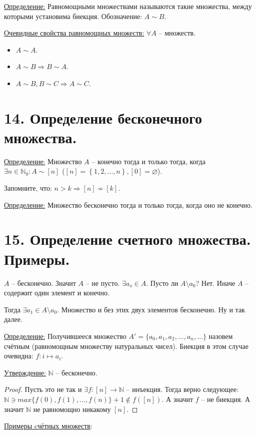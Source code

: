 \documentclass[a4paper, 12pt]{article}
\newcommand{\definition}{\underline{Определение:} }
\newcommand{\statement}{\underline{Утверждение:} }
\newcommand{\N}{\mathbb{N}}
\begin{document}
\definition Равномощными множествами называются такие множества,
между которыми установима биекция. Обозначение: $A \sim B$.

\underline{Очевидные свойства равномощных множеств:} $\forall A$ -- множеств.
\begin{itemize}
        \item $A \sim A$.
        \item $A \sim B \Rightarrow B \sim A$.
        \item $A \sim B, B \sim C \Rightarrow A \sim C$.
\end{itemize}


\section*{14. Определение бесконечного множества.}

\definition Множество $A$ -- конечно тогда и только тогда,
когда $\exists n \in \N_0: A \sim [n]$ ($[n] = \left\{ 1, 2, \ldots, n \right\}, [0] = \varnothing$).

Запомните, что: $n > k \Rightarrow [n] \nsim [k]$.

\definition Множество бесконечно тогда и только тогда, когда оно не конечно.

\section*{15. Определение счетного множества. Примеры.}

$A$ -- бесконечно. Значит $A$ -- не пусто. $\exists a_o \in A$. 
Пусто ли $A\setminus {a_0}$? Нет. Иначе $A$ -- содержит один элемент и конечно.

Тогда $\exists a_1 \in A\setminus {a_0}$. Множество и без этих двух элементов 
бесконечно. Ну и так далее.

\definition Получившееся множество $A' = \{a_0, a_1, a_2, \ldots, a_n, \ldots\}$ 
назовем счётным (равномощным множеству натуральных чисел).
Биекция в этом случае очевидна: $f: i \mapsto a_i$.

\statement $\N$ -- бесконечно.
\begin{proof}
    Пусть это не так и $\exists f: [n] \to \N$ -- инъекция. Тогда верно следующее:
    $\N \ni max\{f(0), f(1), \ldots, f(n)\}+1 \notin f([n])$. А значит $f$ -- не биекция.
    А значит $\N$ не равномощно никакому $[n]$.
\end{proof}

\underline{Примеры cчётных множеств}:
\end{document}
